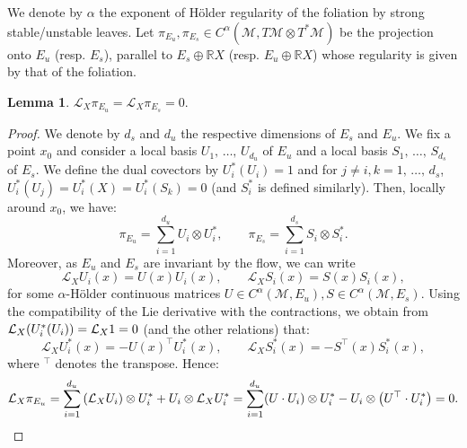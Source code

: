 \documentclass[10pt]{amsart}
\newtheorem{lemm}[theo]{Lemma}\newtheorem{prop}[theo]{Proposition}\newtheorem{coro}[theo]{Corollary}\newtheorem{conj}[theo]{Conjecture}
\theoremstyle{definition}\newtheorem{defi}[theo]{Definition}\newtheorem{rema}[theo]{Remark}\newtheorem{exam}[theo]{Example}\newtheorem{exem}[theo]{Example}\newtheorem{nota}[theo]{Notation}
\newcommand{\R}{\mathbb{R}}
\newcommand{\mc}{\mathcal}
\newcommand{\M}{\mathcal{M}}
\begin{document}
We denote by $\alpha$ the exponent of H\"older regularity of the foliation by strong stable/unstable leaves. Let $\pi_{E_u}, \pi_{E_s} \in C^\alpha(\M, T\M \otimes T^*\M)$ be the projection onto $E_u$ (resp. $E_s$), parallel to $E_s \oplus \R X$ (resp. $E_u \oplus \R X$) whose regularity is given by that of the foliation.

\begin{lemm}\label{lemma:projecteurs}
$\mc{L}_X \pi_{E_u} = \mc{L}_X \pi_{E_s} = 0.$
\end{lemm}

\begin{proof}
We denote by $d_s$ and $d_u$ the respective dimensions of $E_s$ and $E_u$. We fix a point $x_0$ and consider a local basis $U_1,\,\dots,\,U_{d_u}$ of $E_u$ and a local basis $S_1,\,\dots,\,S_{d_s}$ of $E_s$. We define the dual covectors by $U_i^*(U_i) = 1$ and for $j \neq i, k = 1,\,\dots,\,d_s$, $U_i^*(U_j)= U_i^*(X) = U_i^*(S_k) = 0$ (and $S_i^*$ is defined similarly). Then, locally around $x_0$, we have:
\[
\pi_{E_u} = \sum_{i=1}^{d_u} U_i \otimes U_i^*, \qquad \pi_{E_s} = \sum_{i=1}^{d_s} S_i \otimes S_i^*.
\]
Moreover, as $E_u$ and $E_s$ are invariant by the flow, we can write
\[
\mc{L}_X U_i(x) = U(x) U_i(x), \qquad \mc{L}_X S_i(x) = S(x) S_i(x),
\]
for some $\alpha$-H\"older continuous matrices $U \in C^\alpha(\M, E_u), S \in C^\alpha(\M,E_s)$. Using the compatibility of the Lie derivative with the contractions, we obtain from $\mc{L}_X (U_i^*(U_i))\linebreak = \mc{L}_X 1=0$ (and the other relations) that:
\[
\mc{L}_X U_i^*(x) = -U(x)^\top U_i^*(x), \qquad \mc{L}_X S^*_i(x) = -S^\top(x) S_i^*(x),
\]
where ${}^{\top}$ denotes the transpose. Hence:
\[
\mc{L}_X \pi_{E_u} = \sum_{i=1}^{d_u} \left(\mc{L}_XU_i\right) \otimes U_i^* + U_i \otimes \mc{L}_X U_i^* = \sum_{i=1}^{d_u} (U \cdot U_i) \otimes U_i^* - U_i \otimes \left(U^\top \cdot U_i^*\right) = 0.\qedhere
\]
\end{proof}
\end{document}
